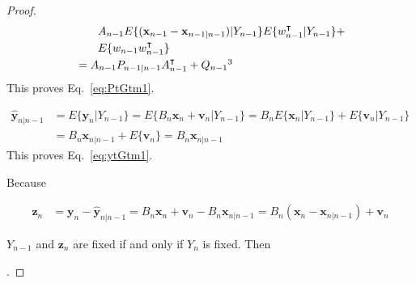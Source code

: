\begin{proof}
\begin{align}
                          &\qquad A_{n-1}E\{(\mathbf{x}_{n-1}-\mathbf{x}_{n-1|n-1})|Y_{n-1}\}E\{w_{n-1}^\intercal|Y_{n-1}\}+\nonumber\\
                          &\qquad E\{w_{n-1}w_{n-1}^\intercal\}\nonumber\\
                          &=A_{n-1}P_{n-1|n-1}A_{n-1}^\intercal+Q_{n-1}\footnotemark[3]\nonumber
    \end{align}
	This proves Eq.~\ref{eq:PtGtm1}.

    \begin{align}
        \hat{\mathbf{y}}_{n|n-1}&=E\{\mathbf{y}_n|Y_{n-1}\}=E\{B_n\mathbf{x}_n+\mathbf{v}_n|Y_{n-1}\}=B_nE\{\mathbf{x}_n|Y_{n-1}\}+E\{\mathbf{v}_n|Y_{n-1}\}\nonumber\\
                                &=B_n\mathbf{x}_{n|n-1}+E\{\mathbf{v}_n\}=B_n\mathbf{x}_{n|n-1}\nonumber
    \end{align}
	This proves Eq.~\ref{eq:ytGtm1}.

    Because

    \begin{align}
        \mathbf{z}_n&=\mathbf{y}_n-\hat{\mathbf{y}}_{n|n-1}=B_n\mathbf{x}_n+\mathbf{v}_n-B_n\mathbf{x}_{n|n-1}=B_n(\mathbf{x}_n-\mathbf{x}_{n|n-1})+\mathbf{v}_n\label{eq:ztProof}
    \end{align}

    \noindent $Y_{n-1}$ and $\mathbf{z}_n$ are fixed if and only if $Y_n$ is
    fixed\footnotemark[4]. Then

    .


\end{proof}
